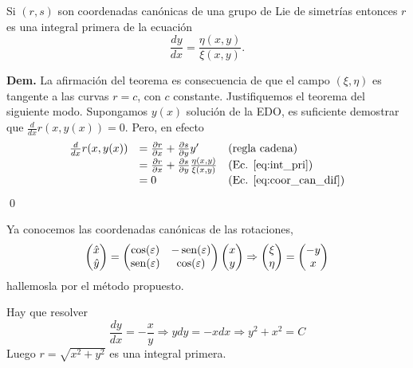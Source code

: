  \begin{teorema}{} Si $(r,s)$ son coordenadas canónicas de una grupo de Lie de simetrías entonces $r$ es una integral primera de la ecuación
\begin{equation}\label{eq:int_pri} \frac{dy}{dx}=\frac{\eta(x,y)}{\xi(x,y)}.
\end{equation}
\end{teorema}
\textbf{Dem.} La afirmación del teorema es consecuencia de que el campo $(\xi,\eta)$ es tangente a las curvas $r=c$, con $c$ constante. Justifiquemos el teorema del siguiente modo.  Supongamos $y(x)$ solución de la EDO, es suficiente demostrar que $\frac{d}{dx}r(x,y(x))=0$. Pero, en efecto
\[
\begin{array}{lll}
 \frac{d}{dx}r(x,y(x)) &=\frac{\partial r}{\partial x}+\frac{\partial s}{\partial y}y' &\text{(regla cadena)}\\
&=\frac{\partial r}{\partial x}+\frac{\partial s}{\partial y}\frac{\eta(x,y)}{\xi(x,y)}& \text{(Ec. \eqref{eq:int_pri})}\\
&=0 & \text{(Ec. \eqref{eq:coor_can_dif})}\\
\end{array}
\]
\qed

\begin{ejemplo}{} Ya conocemos las coordenadas canónicas de las rotaciones,
 \[
 \begin{pmatrix} \hat{x}\\ \hat{y}
\end{pmatrix}=\begin{pmatrix} \cos(\varepsilon) & -\operatorname{sen}(\varepsilon)
\\ \operatorname{sen}(\varepsilon) & \cos(\varepsilon)
\end{pmatrix} \begin{pmatrix} x\\ y
\end{pmatrix}\Rightarrow  \begin{pmatrix} \xi\\ \eta
\end{pmatrix}= \begin{pmatrix} -y\\ x
\end{pmatrix}
\]
hallemosla por el método propuesto.
\end{ejemplo}
Hay que resolver
\[\frac{dy}{dx}=-\frac{x}{y}\Rightarrow ydy=-xdx\Rightarrow y^2+x^2=C\]
Luego $r=\sqrt{x^2+y^2}$ es una integral primera. 




